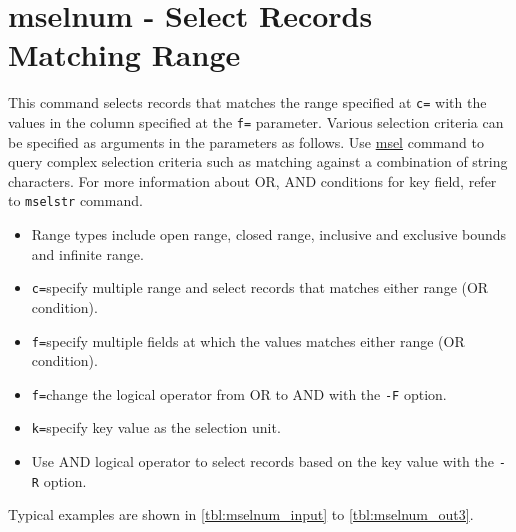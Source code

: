%

\section{mselnum - Select Records Matching Range\label{sect:mselnum}}
This command selects records that matches the range specified at \verb|c=| with the values in the column specified at the \verb|f=| parameter. Various selection criteria can be specified as arguments in the parameters as follows. Use \hyperref[sect:msel]{msel} command to query complex selection criteria such as matching against a combination of string characters. For more information about OR, AND conditions for key field, refer to \verb|mselstr| command.

\begin{itemize}
\item Range types include open range, closed range, inclusive and exclusive bounds and infinite range.
\item \verb|c=|specify multiple range and select records that matches either range (OR condition).
\item \verb|f=|specify multiple fields at which the values matches either range (OR condition).
\item \verb|f=|change the logical operator from OR to AND with the \verb|-F| option.  
\item \verb|k=|specify key value as the selection unit. 
 \item Use AND logical operator to select records based on the key value with the \verb|-R| option.

\end{itemize}

Typical examples are shown in \ref{tbl:mselnum_input} to  \ref{tbl:mselnum_out3}.

